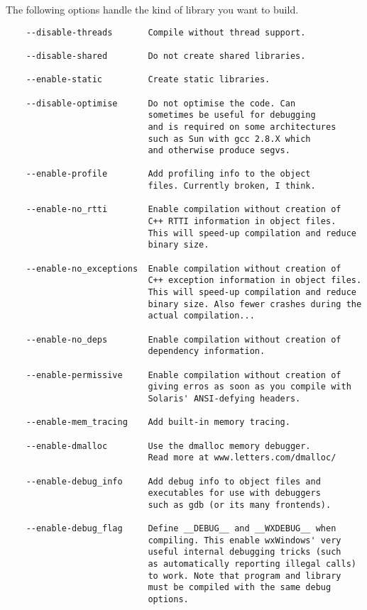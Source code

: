 The following options handle the kind of library you want to build.

\begin{verbatim}
	--disable-threads       Compile without thread support.

	--disable-shared        Do not create shared libraries.

	--enable-static         Create static libraries.

	--disable-optimise	    Do not optimise the code. Can
	                        sometimes be useful for debugging
                            and is required on some architectures
                            such as Sun with gcc 2.8.X which
                            and otherwise produce segvs.

	--enable-profile        Add profiling info to the object 
				            files. Currently broken, I think.
				
	--enable-no_rtti        Enable compilation without creation of
	                        C++ RTTI information in object files. 
                            This will speed-up compilation and reduce 
                            binary size.
				
	--enable-no_exceptions  Enable compilation without creation of
	                        C++ exception information in object files. 
                            This will speed-up compilation and reduce 
                            binary size. Also fewer crashes during the
                            actual compilation...
				
	--enable-no_deps        Enable compilation without creation of
	                        dependency information.
				
	--enable-permissive     Enable compilation without creation of
	                        giving erros as soon as you compile with
				            Solaris' ANSI-defying headers.
				
	--enable-mem_tracing    Add built-in memory tracing.
				
	--enable-dmalloc        Use the dmalloc memory debugger.
	                        Read more at www.letters.com/dmalloc/
				
	--enable-debug_info	    Add debug info to object files and
	                        executables for use with debuggers
				            such as gdb (or its many frontends).

	--enable-debug_flag	    Define __DEBUG__ and __WXDEBUG__ when
	                        compiling. This enable wxWindows' very
                            useful internal debugging tricks (such
                            as automatically reporting illegal calls)
                            to work. Note that program and library
                            must be compiled with the same debug 
                            options.
\end{verbatim}

